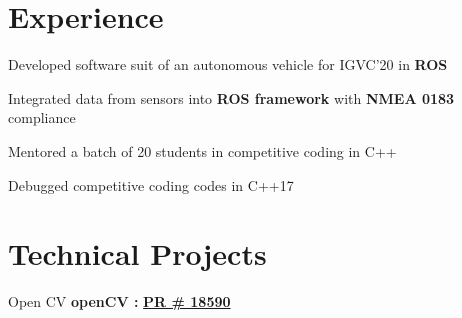 \documentclass[letterpaper]{deedy-resume} %
\begin{document}
\begin{minipage}[t]{0.66\textwidth} %


\section{Experience}


\vspace{\topsep}
\begin{tightitemize}
\item Developed software suit of an autonomous vehicle for IGVC'20 in {\bf ROS}
\item Integrated data from sensors into {\bf{ROS framework}} with {\bf{NMEA 0183}} compliance
\end{tightitemize}

\sectionspace %


\begin{tightitemize}
\item Mentored a batch of 20 students in competitive coding in C++
\item Debugged competitive coding codes in C++17
\end{tightitemize}


\sectionspace %

\section{Technical Projects}

\begin{tightitemize}
\item Open CV {\bf openCV :} \hspace{0.1cm} \href{https://github.com/opencv/opencv/pull/18590}{\textbf{PR \# 18590}}
\end{tightitemize}

\end{minipage}
\end{document}

